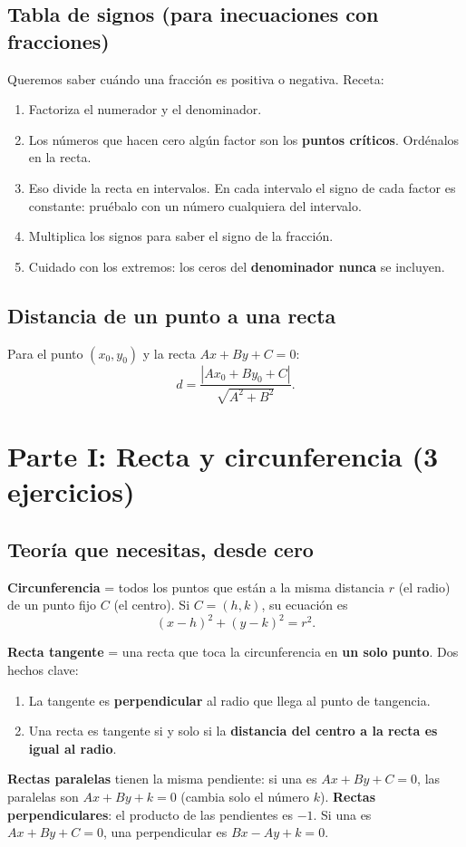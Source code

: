 \documentclass[11pt,a4paper]{article}
\begin{document}
\subsection{Tabla de signos (para inecuaciones con fracciones)}
Queremos saber cuándo una fracción es positiva o negativa. Receta:
\begin{enumerate}[nosep]
  \item Factoriza el numerador y el denominador.
  \item Los números que hacen cero algún factor son los \textbf{puntos críticos}. Ordénalos en la recta.
  \item Eso divide la recta en intervalos. En cada intervalo el signo de cada factor es constante: pruébalo con un número cualquiera del intervalo.
  \item Multiplica los signos para saber el signo de la fracción.
  \item Cuidado con los extremos: los ceros del \textbf{denominador nunca} se incluyen.
\end{enumerate}

\subsection{Distancia de un punto a una recta}
Para el punto $(x_0,y_0)$ y la recta $Ax+By+C=0$:
\[ d=\frac{|Ax_0+By_0+C|}{\sqrt{A^2+B^2}}. \]

\newpage
\section{Parte I: Recta y circunferencia (3 ejercicios)}

\subsection{Teoría que necesitas, desde cero}

\begin{idea}
\textbf{Circunferencia} = todos los puntos que están a la misma distancia $r$ (el radio) de un punto fijo $C$ (el centro).
Si $C=(h,k)$, su ecuación es
\[ (x-h)^2+(y-k)^2=r^2. \]

\textbf{Recta tangente} = una recta que toca la circunferencia en \textbf{un solo punto}.
Dos hechos clave:
\begin{enumerate}[nosep]
  \item La tangente es \textbf{perpendicular} al radio que llega al punto de tangencia.
  \item Una recta es tangente si y solo si la \textbf{distancia del centro a la recta es igual al radio}.
\end{enumerate}

\textbf{Rectas paralelas} tienen la misma pendiente: si una es $Ax+By+C=0$, las paralelas son $Ax+By+k=0$ (cambia solo el número $k$).
\textbf{Rectas perpendiculares}: el producto de las pendientes es $-1$. Si una es $Ax+By+C=0$, una perpendicular es $Bx-Ay+k=0$.
\end{idea}
\end{document}
